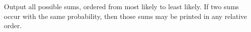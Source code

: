 
  Output all possible sums, ordered from most likely to least likely. If two
  sums occur with the same probability, then those sums may be printed in any
  relative order.
